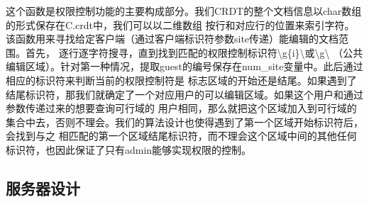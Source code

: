 \documentclass[11pt]{ctexart}
\begin{document}
这个函数是权限控制功能的主要构成部分。我们CRDT的整个文档信息以char数组的形式保存在\textsf{C.crdt}中，我们可以以二维数组
按行和对应行的位置来索引字符。该函数用来寻找给定客户端（通过客户端标识符参数\textsf{site}传递）能编辑的文档范围。首先，
逐行逐字符搜寻，直到找到匹配的权限控制标识符\textsf{\textbackslash g\{i\}\textbackslash}或\textsf{\textbackslash g\textbackslash}
（公共编辑区域）。针对第一种情况，提取guest的编号保存在\textsf{num\_site}变量中。此后通过相应的标识符来判断当前的权限控制符是
标志区域的开始还是结尾。如果遇到了结尾标识符，那我们就确定了一个对应用户的可以编辑区域。如果这个用户和通过参数传递过来的想要查询可行域的
用户相同，那么就把这个区域加入到可行域的集合中去，否则不理会。我们的算法设计也使得遇到了第一个区域开始标识符后，会找到与之
相匹配的第一个区域结尾标识符，而不理会这个区域中间的其他任何标识符，也因此保证了只有admin能够实现权限的控制。

\subsection{服务器设计}

\clearpage

\nocite{*}


\end{document}
